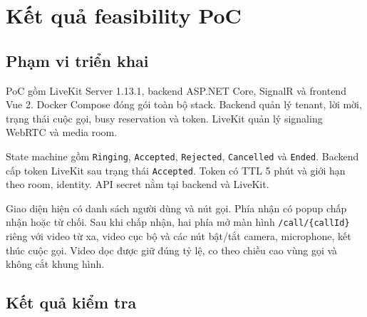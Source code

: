 \section{Kết quả feasibility PoC}

\subsection{Phạm vi triển khai}

PoC gồm LiveKit Server 1.13.1, backend ASP.NET Core, SignalR và frontend Vue 2. Docker
Compose đóng gói toàn bộ stack. Backend quản lý tenant, lời mời, trạng thái cuộc gọi,
busy reservation và token. LiveKit quản lý signaling WebRTC và media room.

State machine gồm \texttt{Ringing}, \texttt{Accepted}, \texttt{Rejected},
\texttt{Cancelled} và \texttt{Ended}. Backend cấp token LiveKit sau trạng thái
\texttt{Accepted}. Token có TTL 5 phút và giới hạn theo room, identity. API secret nằm
tại backend và LiveKit.

Giao diện hiện có danh sách người dùng và nút gọi. Phía nhận có popup chấp nhận hoặc từ
chối. Sau khi chấp nhận, hai phía mở màn hình \texttt{/call/\{callId\}} riêng với video
từ xa, video cục bộ và các nút bật/tắt camera, microphone, kết thúc cuộc gọi. Video dọc
được giữ đúng tỷ lệ, co theo chiều cao vùng gọi và không cắt khung hình.

\subsection{Kết quả kiểm tra}

